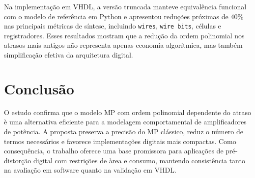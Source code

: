 \documentclass[sigconf]{acmart}
\begin{document}
Na implementa\c{c}\~ao em VHDL, a vers\~ao truncada manteve equival\^encia funcional com o modelo de refer\^encia em Python e apresentou redu\c{c}\~oes pr\'oximas de 40\% nas principais m\'etricas de s\'intese, incluindo \texttt{wires}, \texttt{wire bits}, c\'elulas e registradores. Esses resultados mostram que a redu\c{c}\~ao da ordem polinomial nos atrasos mais antigos n\~ao representa apenas economia algor\'itmica, mas tamb\'em simplifica\c{c}\~ao efetiva da arquitetura digital.

\section{Conclus\~ao}
O estudo confirma que o modelo MP com ordem polinomial dependente do atraso \`e uma alternativa eficiente para a modelagem comportamental de amplificadores de pot\^encia. A proposta preserva a precis\~ao do MP cl\'assico, reduz o n\'umero de termos necess\'arios e favorece implementa\c{c}\~oes digitais mais compactas. Como consequ\^encia, o trabalho oferece uma base promissora para aplica\c{c}\~oes de pr\'e-distor\c{c}\~ao digital com restri\c{c}\~oes de \`area e consumo, mantendo consist\^encia tanto na avalia\c{c}\~ao em software quanto na valida\c{c}\~ao em VHDL.



\end{document}
